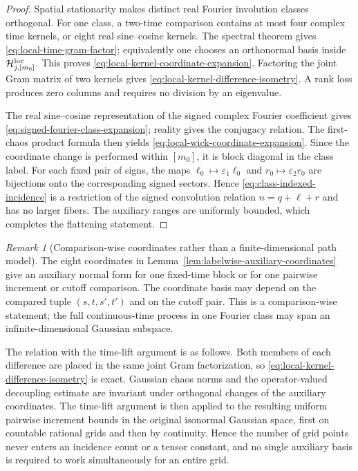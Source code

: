\documentclass[10pt]{amsart}
\numberwithin{equation}{section}
\theoremstyle{plain}
\theoremstyle{definition}
\theoremstyle{remark}
\newtheorem{remark}[theorem]{Remark}
\begin{document}
\begin{proof}
Spatial stationarity makes distinct real Fourier involution classes orthogonal.
For one class, a two-time comparison contains at most four complex time kernels,
or eight real sine--cosine kernels.  The spectral theorem gives
\eqref{eq:local-time-gram-factor}; equivalently one chooses an orthonormal basis
inside $\mathcal H_{j,[m_0]}^{\rm loc}$.  This proves
\eqref{eq:local-kernel-coordinate-expansion}.  Factoring the joint Gram matrix
of two kernels gives \eqref{eq:local-kernel-difference-isometry}.  A rank loss
produces zero columns and requires no division by an eigenvalue.

The real sine--cosine representation of the signed complex Fourier coefficient
gives \eqref{eq:signed-fourier-class-expansion}; reality gives the conjugacy
relation.  The first-chaos product formula then yields
\eqref{eq:local-wick-coordinate-expansion}.  Since the coordinate change is
performed within $[m_0]$, it is block diagonal in the class label.  For each
fixed pair of signs, the maps
$\ell_0\mapsto\varepsilon_1\ell_0$ and
$r_0\mapsto\varepsilon_2r_0$ are bijections onto the corresponding signed
sectors.  Hence \eqref{eq:class-indexed-incidence} is a restriction of the
signed convolution relation $n=q+\ell+r$ and has no larger fibers.  The auxiliary ranges
are uniformly bounded, which completes the flattening statement.
\end{proof}

\begin{remark}[Comparison-wise coordinates rather than a finite-dimensional path model]
\label{rem:comparison-wise-gram-coordinates}
The eight coordinates in Lemma~\ref{lem:labelwise-auxiliary-coordinates} give an
auxiliary normal form for one fixed-time block or for one pairwise increment or
cutoff comparison.  The coordinate basis may depend on the compared tuple
$(s,t,s',t')$ and on the cutoff pair.  This is a comparison-wise statement; the
full continuous-time process in one Fourier class may span an
infinite-dimensional Gaussian subspace.

The relation with the time-lift argument is as follows.  Both members of each difference are
placed in the same joint Gram factorization, so
\eqref{eq:local-kernel-difference-isometry} is exact.  Gaussian chaos norms and
the operator-valued decoupling estimate are invariant under orthogonal changes
of the auxiliary coordinates.  The time-lift argument is then applied to the
resulting uniform pairwise increment bounds in the original isonormal Gaussian
space, first on countable rational grids and then by continuity.  Hence the
number of grid points never enters an incidence count or a tensor constant, and
no single auxiliary basis is required to work simultaneously for an entire
grid.
\end{remark}
\end{document}

